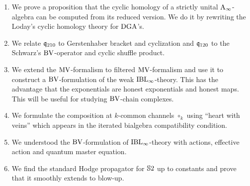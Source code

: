 \documentclass[\MainFolder/Text.tex]{subfiles}
\begin{document}
\begin{enumerate}[label=\arabic*)]
\item We prove a proposition that the cyclic homology of a strictly unital $\mathrm{A}_\infty$-algebra can be computed from its reduced version. We do it by rewriting the Loday's cyclic homology theory for $\mathrm{DGA}$'s.

\item We relate $\mathfrak{q}_{210}$ to Gerstenhaber bracket and cyclization and $\mathfrak{q}_{120}$ to the Schwarz's $\mathrm{BV}$-operator and cyclic shuffle product.

\item We extend the $\mathrm{MV}$-formalism to filtered $\mathrm{MV}$-formalism and use it to construct a $\mathrm{BV}$-formulation of the weak $\mathrm{IBL}_\infty$-theory. This has the advantage that the exponentials are honest exponentials and honest maps. This will be useful for studying $\mathrm{BV}$-chain complexes.

\item We formulate the composition at $k$-common channels $\circ_k$ using ``heart with veins'' which appears in the iterated bialgebra compatibility condition.

\item We understood the $\mathrm{BV}$-formulation of $\mathrm{IBL}_\infty$-theory with actions, effective action and quantum master equation.

\item We find the standard Hodge propagator for $\mathbb{S}{2}$ up to constants and prove that it smoothly extends to blow-up.
\end{enumerate}

%
\end{document}
